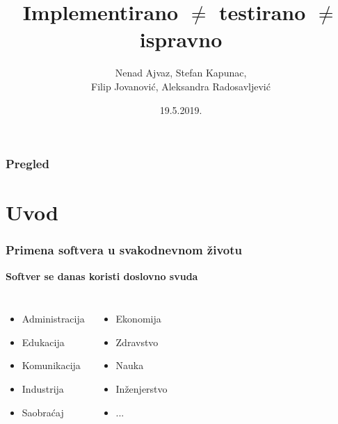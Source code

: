 \documentclass{beamer}
\title[Pouzdanost Softvera]{Implementirano $\neq$ testirano $\neq$ ispravno} %
\author{Nenad Ajvaz, Stefan Kapunac,\\ Filip Jovanović, Aleksandra Radosavljević} %
\institute[MATF] %
{
Univerzitet u Beogradu, Matematički Fakultet \\ %
\medskip
}
\date{19.5.2019.} %
\begin{document}
\begin{frame}
\titlepage %
\end{frame}

\begin{frame}
\frametitle{Pregled} %
\tableofcontents %
\end{frame}



\section{Uvod}
\begin{frame} 
\frametitle{Primena softvera u svakodnevnom životu}
\textbf{Softver se danas koristi doslovno svuda}

\begin{columns}[c] %
\begin{itemize}
\item Administracija
\item Edukacija
\item Komunikacija
\item Industrija
\item Saobraćaj
\end{itemize}

\begin{itemize}
\item Ekonomija
\item Zdravstvo
\item Nauka
\item Inženjerstvo
\item ...
\end{itemize}
\end{columns}
\end{frame}
\end{document}
